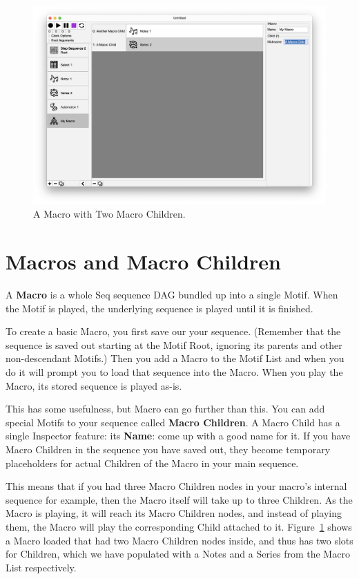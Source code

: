 \documentclass[twoside,10pt]{article}
\begin{document}
\clearpage

\begin{figure}[t]
\centering
\includegraphics[width=6.5in]{Macro}
\vspace{-3em}
\caption{A Macro with Two Macro Children.}
\label{macro}
\end{figure}

\section{Macros and Macro Children}

A {\bf Macro} is a whole Seq sequence DAG bundled up into a single Motif.  When the Motif is played, the underlying sequence is played until it is finished.

To create a basic Macro, you first save our your sequence.  (Remember that the sequence is saved out starting at the Motif Root, ignoring its parents and other non-descendant Motifs.)  Then you add a Macro to the Motif List and when you do it will prompt you to load that sequence into the Macro.    When you play the Macro, its stored sequence is played as-is.

This has some usefulness, but Macro can go further than this.  You can add special Motifs to your sequence called {\bf Macro Children}.  A Macro Child has a single Inspector feature: its {\bf Name}: come up with a good name for it.  If you have Macro Children in the sequence you have saved out, they become temporary placeholders for actual Children of the Macro in  your main sequence.

This means that if you had three Macro Children nodes in your macro's internal sequence for example, then the Macro itself will take up to three Children.  As the Macro is playing, it will reach its Macro Children nodes, and instead of playing them, the Macro will play the corresponding Child attached to it.  Figure~\ref{macro} shows a Macro loaded that had two Macro Children nodes inside, and thus has two slots for Children, which we have populated with a Notes and a Series from the Macro List respectively.
\end{document}
